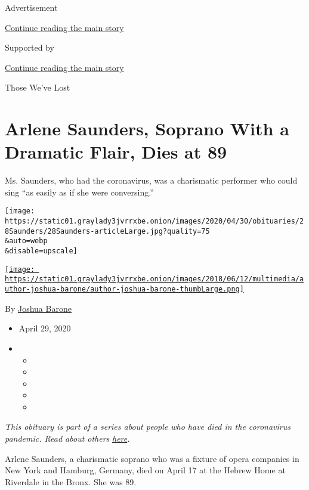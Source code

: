 Advertisement

\protect\hyperlink{after-top}{Continue reading the main story}

Supported by

\protect\hyperlink{after-sponsor}{Continue reading the main story}

Those We've Lost

\hypertarget{arlene-saunders-soprano-with-a-dramatic-flair-dies-at-89}{%
\section{Arlene Saunders, Soprano With a Dramatic Flair, Dies at
89}\label{arlene-saunders-soprano-with-a-dramatic-flair-dies-at-89}}

Ms. Saunders, who had the coronavirus, was a charismatic performer who
could sing ``as easily as if she were conversing.''

\texttt{[image: https://static01.graylady3jvrrxbe.onion/images/2020/04/30/obituaries/28Saunders/28Saunders-articleLarge.jpg?quality=75\\\&auto=webp\\\&disable=upscale]}

\href{https://www.nytimes3xbfgragh.onion/by/joshua-barone}{\texttt{[image: https://static01.graylady3jvrrxbe.onion/images/2018/06/12/multimedia/author-joshua-barone/author-joshua-barone-thumbLarge.png]}}

By \href{https://www.nytimes3xbfgragh.onion/by/joshua-barone}{Joshua
Barone}

\begin{itemize}
\item
  April 29, 2020
\item
  \begin{itemize}
  \item
  \item
  \item
  \item
  \item
  \end{itemize}
\end{itemize}

\emph{This obituary is part of a series about people who have died in
the coronavirus pandemic. Read about others}
\href{https://www.nytimes3xbfgragh.onion/series/people-who-have-died-of-the-coronavirus}{\emph{here}}\emph{.}

Arlene Saunders, a charismatic soprano who was a fixture of opera
companies in New York and Hamburg, Germany, died on April 17 at the
Hebrew Home at Riverdale in the Bronx. She was 89.

